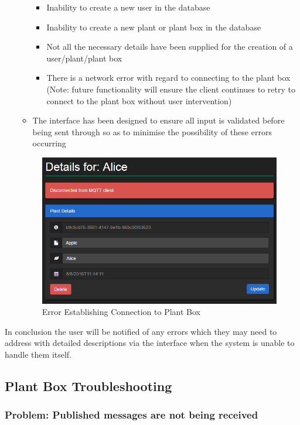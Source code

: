 \documentclass{article}
\begin{document}
\begin{itemize}
\begin{itemize}
				\begin{itemize}
					\item Inability to create a new user in the database
					\item Inability to create a new plant or plant box in the database
					\item Not all the necessary details have been supplied for the creation of a user/plant/plant box
					\item There is a network error with regard to connecting to the plant box (Note: future functionality will ensure the client continues to retry to connect to the plant box without user intervention)
				\end{itemize}
				\item The interface has been designed to ensure all input is validated before being sent through so as to minimise the possibility of these errors occurring
			\end{itemize}
			\begin{figure}[H]
				\includegraphics[width=\textwidth]{../images/UserManual/500error.png}
				\caption{Error Establishing Connection to Plant Box}
			\end{figure}
	\end{itemize}

	In conclusion the user will be notified of any errors which they may need to address with detailed descriptions via the interface when the system is unable to handle them itself.
	
	\subsection{Plant Box Troubleshooting}
		\subsubsection{Problem: Published messages are not being received}
\end{document}
